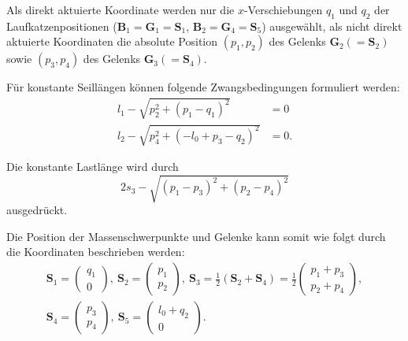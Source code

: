Als direkt aktuierte Koordinate werden nur die $x$-Verschiebungen $q_1$ und $q_2$ der Laufkatzenpositionen ($\mathbf{B}_1 = \mathbf{G}_1 = \mathbf{S}_1$, $\mathbf{B}_2 = \mathbf{G}_4 = \mathbf{S}_5$) ausgewählt, als nicht direkt aktuierte Koordinaten die absolute Position $(p_1, p_2)$ des Gelenks $\mathbf{G}_2 (= \mathbf{S}_2)$ sowie $(p_3, p_4)$ des Gelenks $\mathbf{G}_3 (=\mathbf{S}_4)$. 

Für konstante Seillängen können folgende Zwangsbedingungen formuliert werden:
\begin{align}
	l_{1} - \sqrt{p_{2}^{2} + \left(p_{1} - q_{1}\right)^{2}} &= 0\\
	l_{2} - \sqrt{p_{4}^{2} + \left(- l_{0} + p_{3} - q_{2}\right)^{2}} &= 0.	
\end{align}

Die konstante Lastlänge wird durch
\begin{equation}
	2 s_{3} - \sqrt{\left(p_{1} - p_{3}\right)^{2} + \left(p_{2} - p_{4}\right)^{2}}
\end{equation}
ausgedrückt.

Die Position der Massenschwerpunkte und Gelenke kann somit wie folgt durch die Koordinaten beschrieben werden:
\begin{align}
	\mathbf{S}_1 =
	\begin{pmatrix}
		q_1 \\
		0
	\end{pmatrix}, 
	\
	\mathbf{S}_2 =
	\begin{pmatrix}
		p_1 \\
		p_2
	\end{pmatrix},
	\
	\mathbf{S}_3 =
	\frac{1}{2}(\mathbf{S}_2 + \mathbf{S}_4) =
	\frac{1}{2}
	\begin{pmatrix}
		p_1 + p_3 \\
		p_2 + p_4
	\end{pmatrix},
	\nonumber \\
	\mathbf{S}_4 =
	\left(\begin{matrix}
		p_3 \\
		p_4
	\end{matrix}\right),
	\
	\mathbf{S}_5 =
	\left(\begin{matrix}
		l_0 + q_2 \\
		0
	\end{matrix}\right).
\end{align}

